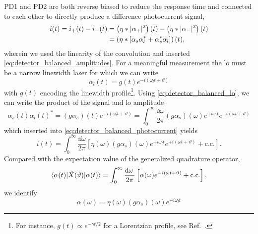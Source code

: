 PD1 and PD2 are both reverse biased to reduce the response time and connected to each other to directly produce a difference photocurrent signal,
\begin{equation}
	\begin{split}
		i(t)
		=
		i_+(t)
		-
		i_-(t)
		&=
		\left(
			\eta
			*
			\lvert\alpha_+\rvert^2
		\right)(t)
		-
		\left(
			\eta
			*
			\lvert\alpha_-\rvert^2
		\right)(t)
		\\
		&=
		\left(
			\eta*
			\left[
				\alpha_s
				\alpha_l^*
				+
				\alpha_s^*
				\alpha_l
			\right]
		\right)(t)
		,
	\end{split}
	\label{eq:detector_balanced_photocurrent}
\end{equation}
wherein we used the linearity of the convolution and inserted \cref{eq:detector_balanced_amplitudes}.
For a meaningful measurement the \gls{lo} must be a narrow linewidth laser for which we can write
\begin{equation}
	\alpha_l(t)
	=
	g(t)
	e^{-i(\omega_lt+\vartheta)}
	\label{eq:detector_balanced_lo}
\end{equation}
with $g(t)$ encoding the linewidth profile\footnote{For instance, $g(t)\propto e^{-\gamma t/2}$ for a Lorentzian profile, see Ref.~\cite{Demtroeder2014}.}.
Using \cref{eq:detector_balanced_lo}, we can write the product of the signal and \gls{lo} amplitude
\begin{equation}
	\alpha_s(t)
	\alpha_l(t)^*
	=
	(g\alpha_s)(t)
	e^{+i(\omega_lt+\vartheta)}
	=
	\int_0^\infty
	\frac{\dd{\omega}}{2\pi}
	(g\alpha_s)(\omega)
	e^{+i\omega_l t}
	e^{+i(\omega t+\vartheta)}
\end{equation}
which inserted into \cref{eq:detector_balanced_photocurrent} yields
\begin{equation}
	i(t)
	=
	\int_0^\infty
	\frac{\dd{\omega}}{2\pi}
	\left[
		\eta(\omega)
		(g\alpha_s)(\omega)
		e^{+i\omega_l t}
		e^{+i(\omega t+\vartheta)}
		+
		\text{c.c.}
	\right]
	.
\end{equation}
Compared with the expectation value of the generalized quadrature operator,
\begin{equation}
	\bra{\alpha(t)}
	\hat{X}(\vartheta)
	\ket{\alpha(t)}
	=
	\int_0^\infty
	\frac{\dd{\omega}}{2\pi}
	\left[
		\alpha(\omega)
		e^{-i(\omega t+\vartheta)}
		+
		\text{c.c.}
	\right]
	,
\end{equation}
we identify
\begin{equation}
	\alpha(\omega)
	=
	\eta(\omega)
	(g\alpha_s)(\omega)
	e^{+i\omega_l t}
\end{equation}